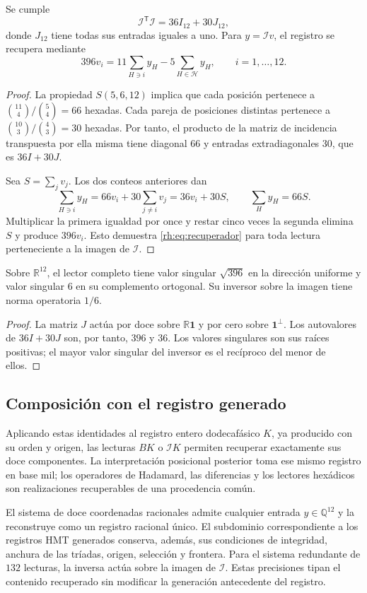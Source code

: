 \begin{theorem}
\label{rh:thm:steiner}
Se cumple
\[
\mathcal I^{\mathsf T}\mathcal I=36I_{12}+30J_{12},
\]
donde $J_{12}$ tiene todas sus entradas iguales a uno. Para
$y=\mathcal I v$, el registro se recupera mediante
\begin{equation}
396v_i=11\sum_{H\ni i}y_H-5\sum_{H\in\mathcal H}y_H,
\qquad i=1,\ldots,12.
\label{rh:eq:recuperador}
\end{equation}
\end{theorem}
\begin{proof}
La propiedad $S(5,6,12)$ implica que cada posición pertenece a
$\binom{11}{4}/\binom{5}{4}=66$ hexadas. Cada pareja de posiciones
distintas pertenece a $\binom{10}{3}/\binom{4}{3}=30$ hexadas.
Por tanto, el producto de la matriz de incidencia transpuesta por
ella misma tiene diagonal $66$ y entradas extradiagonales $30$, que
es $36I+30J$.

Sea $S=\sum_jv_j$. Los dos conteos anteriores dan
\[
\sum_{H\ni i}y_H=66v_i+30\sum_{j\ne i}v_j=36v_i+30S,
\qquad
\sum_Hy_H=66S.
\]
Multiplicar la primera igualdad por once y restar cinco veces la
segunda elimina $S$ y produce $396v_i$. Esto demuestra
\eqref{rh:eq:recuperador} para toda lectura perteneciente a la
imagen de $\mathcal I$.
\end{proof}

\begin{corollary}
Sobre $\mathbb R^{12}$, el lector completo tiene valor singular
$\sqrt{396}$ en la dirección uniforme y valor singular $6$ en su
complemento ortogonal. Su inversor sobre la imagen tiene norma
operatoria $1/6$.
\end{corollary}
\begin{proof}
La matriz $J$ actúa por doce sobre $\mathbb R\mathbf1$ y por cero
sobre $\mathbf1^\perp$. Los autovalores de $36I+30J$ son, por
tanto, $396$ y $36$. Los valores singulares son sus raíces
positivas; el mayor valor singular del inversor es el recíproco
del menor de ellos.
\end{proof}

\subsection{Composición con el registro generado}

Aplicando estas identidades al registro entero dodecafásico $K$, ya
producido con su orden y origen, las lecturas $BK$ o $\mathcal I K$
permiten recuperar exactamente sus doce componentes. La interpretación
posicional posterior toma ese mismo registro en base mil; los
operadores de Hadamard, las diferencias y los lectores hexádicos son
realizaciones recuperables de una procedencia común.

El sistema de doce coordenadas racionales admite cualquier entrada
$y\in\mathbb Q^{12}$ y la reconstruye como un registro racional
único. El subdominio correspondiente a los registros HMT generados
conserva, además, sus condiciones de integridad, anchura de las
tríadas, origen, selección y frontera. Para el sistema redundante de
$132$ lecturas, la inversa actúa sobre la imagen de $\mathcal I$.
Estas precisiones tipan el contenido recuperado sin modificar la
generación antecedente del registro.
